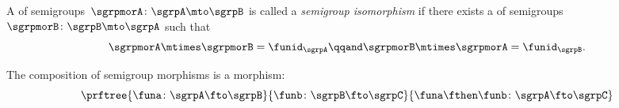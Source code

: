 \begin{ctdefinition}
    \label{def:semigroup-iso}
    A \whomo of semigroups~$\sgrpmorA\colon \sgrpA \mto \sgrpB$ is called a \emph{semigroup isomorphism} if there exists a \whomo of semigroups~$\sgrpmorB\colon \sgrpB \mto \sgrpA$ such that
    \begin{equation}
        \label{eq:sgrp-iso-cond}
        \sgrpmorA \mtimes \sgrpmorB = \funid_\sgrpA  \qqand \sgrpmorB \mtimes \sgrpmorA = \funid_\sgrpB.
    \end{equation}
\end{ctdefinition}

\begin{lemma}
    \label{lem:semigroup-morphisms-compose}
    The composition of semigroup morphisms is a morphism:
    \begin{equation}
        \label{eq:sgrp-mor-compo}
        \prftree{\funa  \colon \sgrpA \fto \sgrpB}{\funb \colon  \sgrpB \fto \sgrpC}{
            \funa \fthen \funb  \colon \sgrpA \fto \sgrpC}
    \end{equation}
\end{lemma}

